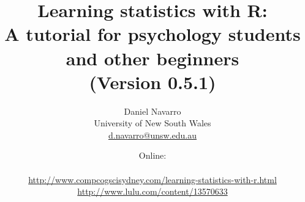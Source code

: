 

\date{Online: \\  \hfill \\ \url{http://www.compcogscisydney.com/learning-statistics-with-r.html} \hfill \\ \url{http://www.lulu.com/content/13570633} }
\title{Learning statistics with R: \\ A tutorial for psychology students and other beginners \vspace*{12pt}
\\ (Version 0.5.1) \\ \vspace*{24pt}}
\author{Daniel Navarro \\ University of New South Wales \\ \url{d.navarro@unsw.edu.au} \vspace*{36pt}}


 
